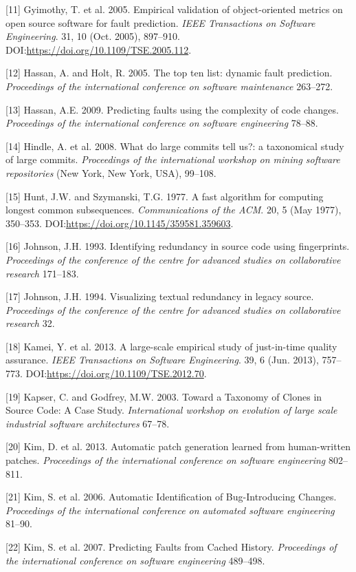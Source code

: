 \documentclass[sigconf]{acmart}
\begin{document}
[11] Gyimothy, T. et al. 2005. Empirical validation of
object-oriented metrics on open source software for fault prediction.
\emph{IEEE Transactions on Software Engineering}. 31, 10 (Oct. 2005),
897--910. DOI:\url{https://doi.org/10.1109/TSE.2005.112}.

[12] Hassan, A. and Holt, R. 2005. The top ten list: dynamic fault
prediction. \emph{Proceedings of the international conference on
software maintenance} 263--272.

[13] Hassan, A.E. 2009. Predicting faults using the complexity of
code changes. \emph{Proceedings of the international conference on
software engineering} 78--88.

[14] Hindle, A. et al. 2008. What do large commits tell us?: a
taxonomical study of large commits. \emph{Proceedings of the
international workshop on mining software repositories} (New York, New
York, USA), 99--108.

[15] Hunt, J.W. and Szymanski, T.G. 1977. A fast algorithm for
computing longest common subsequences. \emph{Communications of the ACM}.
20, 5 (May 1977), 350--353.
DOI:\url{https://doi.org/10.1145/359581.359603}.

[16] Johnson, J.H. 1993. Identifying redundancy in source code using
fingerprints. \emph{Proceedings of the conference of the centre for
advanced studies on collaborative research} 171--183.

[17] Johnson, J.H. 1994. Visualizing textual redundancy in legacy
source. \emph{Proceedings of the conference of the centre for advanced
studies on collaborative research} 32.

[18] Kamei, Y. et al. 2013. A large-scale empirical study of
just-in-time quality assurance. \emph{IEEE Transactions on Software
Engineering}. 39, 6 (Jun. 2013), 757--773.
DOI:\url{https://doi.org/10.1109/TSE.2012.70}.

[19] Kapser, C. and Godfrey, M.W. 2003. Toward a Taxonomy of Clones
in Source Code: A Case Study. \emph{International workshop on evolution
of large scale industrial software architectures} 67--78.

[20] Kim, D. et al. 2013. Automatic patch generation learned from
human-written patches. \emph{Proceedings of the international conference
on software engineering} 802--811.

[21] Kim, S. et al. 2006. Automatic Identification of
Bug-Introducing Changes. \emph{Proceedings of the international
conference on automated software engineering} 81--90.

[22] Kim, S. et al. 2007. Predicting Faults from Cached History.
\emph{Proceedings of the international conference on software
engineering} 489--498.
\end{document}
